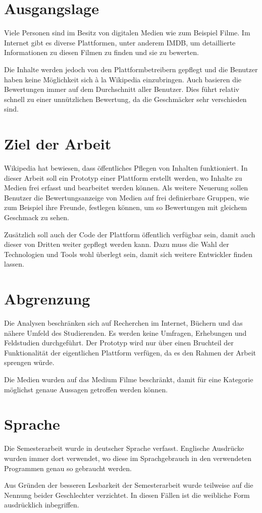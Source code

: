 \section{Ausgangslage}
Viele Personen sind im Besitz von digitalen Medien wie zum Beispiel Filme.
Im Internet gibt es diverse Plattformen, unter anderem IMDB, um 
detaillierte Informationen zu diesen Filmen zu finden und sie zu bewerten. 

Die Inhalte werden jedoch von den Plattformbetreibern gepflegt und die 
Benutzer haben keine Möglichkeit sich à la Wikipedia einzubringen. Auch 
basieren die Bewertungen immer auf dem Durchschnitt aller Benutzer. Dies
führt relativ schnell zu einer unnützlichen Bewertung, da die Geschmäcker
sehr verschieden sind.

\section{Ziel der Arbeit}
Wikipedia hat bewiesen, dass öffentliches Pflegen von Inhalten 
funktioniert. In dieser Arbeit soll ein Prototyp einer Plattform erstellt
werden, wo Inhalte zu Medien frei erfasst und bearbeitet werden können.
Als weitere Neuerung sollen Benutzer die Bewertungsanzeige von Medien auf
frei definierbare Gruppen, wie zum Beispiel ihre Freunde, festlegen 
können, um so Bewertungen mit gleichem Geschmack zu sehen.

Zusätzlich soll auch der Code der Plattform öffentlich verfügbar sein, 
damit auch dieser von Dritten weiter gepflegt werden kann. Dazu muss die 
Wahl der Technologien und Tools wohl überlegt sein, damit sich weitere 
Entwickler finden lassen.

\section{Abgrenzung}
Die Analysen beschränken sich auf Recherchen im Internet, Büchern und das 
nähere Umfeld des Studierenden. Es werden keine Umfragen, Erhebungen und 
Feldstudien durchgeführt. Der Prototyp wird nur über einen Bruchteil der 
Funktionalität der eigentlichen Plattform verfügen, da es den Rahmen
der Arbeit sprengen würde.

Die Medien wurden auf das Medium Filme beschränkt, damit für eine 
Kategorie möglichst genaue Aussagen getroffen werden können.

\section{Sprache}
Die Semesterarbeit wurde in deutscher Sprache verfasst. Englische Ausdrücke 
wurden immer dort verwendet, wo diese im Sprachgebrauch in den verwendeten 
Programmen genau so gebraucht werden.

Aus Gründen der besseren Lesbarkeit der Semesterarbeit wurde teilweise auf 
die Nennung beider Geschlechter verzichtet. In diesen Fällen ist die 
weibliche Form ausdrücklich inbegriffen.